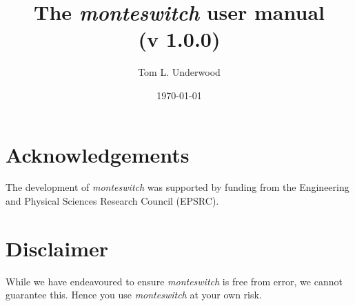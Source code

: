 \documentclass{report}
\begin{document}
\sloppy

\title{The \emph{monteswitch} user manual\\ (v 1.0.0)}
\author{Tom L. Underwood}
\date{\today}
\maketitle


\tableofcontents


\chapter*{Acknowledgements}
The development of \emph{monteswitch} was supported by funding from the Engineering and Physical Sciences Research Council (EPSRC).

\chapter*{Disclaimer}
While we have endeavoured to ensure \emph{monteswitch} is free from error, we cannot guarantee this. Hence you use \emph{monteswitch}
at your own risk.

\renewcommand{\nomname}{List of Abbreviations}
\printnomenclature

\end{document}
